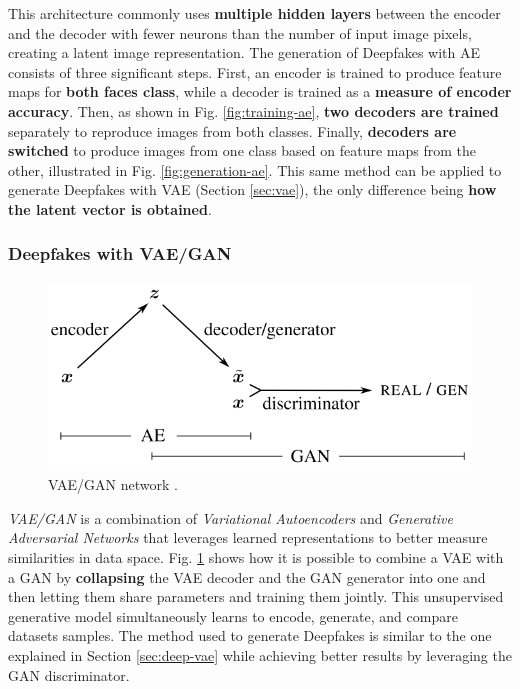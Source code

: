 \documentclass[preprint]{elsarticle}
\begin{document}
This architecture commonly uses \textbf{multiple hidden layers} between the encoder and the decoder 
with fewer neurons than the number of input image pixels, creating a latent image representation. 
The generation of Deepfakes with AE consists of three significant steps.
First, an encoder is trained to produce feature maps for \textbf{both faces class}, while a decoder is trained as a \textbf{measure of encoder accuracy}. 
Then, as shown in Fig. \ref{fig:training-ae}, \textbf{two decoders are trained} separately to reproduce images from both classes. Finally, \textbf{decoders are switched} to produce
images from one class based on feature maps from the other, illustrated in Fig. \ref{fig:generation-ae}.
This same method can be applied to generate Deepfakes with VAE (Section \ref{sec:vae}), the only difference being \textbf{how the latent
	vector is obtained}.

\subsubsection{Deepfakes with VAE/GAN}
\begin{figure}[H]
	\centering
	\includegraphics[scale=0.35]{img/background_img/vae-gan.png}
	\caption{VAE/GAN network \cite{larsen2016autoencoding}.}
	\label{fig:vae-gan}
\end{figure}
\emph{VAE/GAN} \cite{larsen2016autoencoding} is a combination of \emph{Variational Autoencoders} and \emph{Generative Adversarial Networks}
that leverages learned representations to better measure similarities in data space.
Fig. \ref{fig:vae-gan} shows how it is possible to combine a VAE with a GAN by \textbf{collapsing} the VAE decoder and the GAN generator 
into one and then letting them share parameters and training them jointly. 
This unsupervised generative model simultaneously learns to encode, generate, and compare datasets samples. 
The method used to generate Deepfakes is similar to the one explained in Section \ref{sec:deep-vae} while achieving 
better results by leveraging the GAN discriminator.
\end{document}
